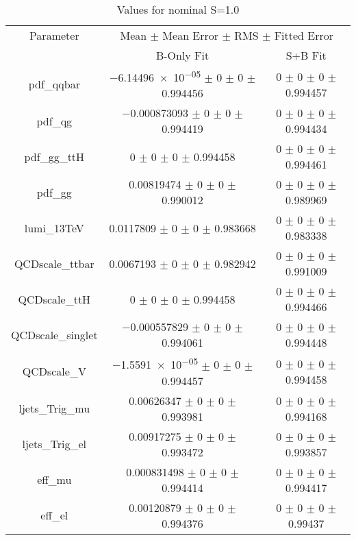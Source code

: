\begin{table}
\centering
\caption{Values for nominal S=1.0}
\begin{tabular}{ccc}
\toprule
Parameter & \multicolumn{2}{c}{Mean $\pm$ Mean Error $\pm$ RMS $\pm$ Fitted Error}\\
 & B-Only Fit & S+B Fit\\
\midrule
pdf\_qqbar & \num{-6.14496e-05} $\pm$ \num{0} $\pm$ \num{0} $\pm$ \num{0.994456} & \num{0} $\pm$ \num{0} $\pm$ \num{0} $\pm$ \num{0.994457}\\
pdf\_qg & \num{-0.000873093} $\pm$ \num{0} $\pm$ \num{0} $\pm$ \num{0.994419} & \num{0} $\pm$ \num{0} $\pm$ \num{0} $\pm$ \num{0.994434}\\
pdf\_gg\_ttH & \num{0} $\pm$ \num{0} $\pm$ \num{0} $\pm$ \num{0.994458} & \num{0} $\pm$ \num{0} $\pm$ \num{0} $\pm$ \num{0.994461}\\
pdf\_gg & \num{0.00819474} $\pm$ \num{0} $\pm$ \num{0} $\pm$ \num{0.990012} & \num{0} $\pm$ \num{0} $\pm$ \num{0} $\pm$ \num{0.989969}\\
lumi\_13TeV & \num{0.0117809} $\pm$ \num{0} $\pm$ \num{0} $\pm$ \num{0.983668} & \num{0} $\pm$ \num{0} $\pm$ \num{0} $\pm$ \num{0.983338}\\
QCDscale\_ttbar & \num{0.0067193} $\pm$ \num{0} $\pm$ \num{0} $\pm$ \num{0.982942} & \num{0} $\pm$ \num{0} $\pm$ \num{0} $\pm$ \num{0.991009}\\
QCDscale\_ttH & \num{0} $\pm$ \num{0} $\pm$ \num{0} $\pm$ \num{0.994458} & \num{0} $\pm$ \num{0} $\pm$ \num{0} $\pm$ \num{0.994466}\\
QCDscale\_singlet & \num{-0.000557829} $\pm$ \num{0} $\pm$ \num{0} $\pm$ \num{0.994061} & \num{0} $\pm$ \num{0} $\pm$ \num{0} $\pm$ \num{0.994448}\\
QCDscale\_V & \num{-1.5591e-05} $\pm$ \num{0} $\pm$ \num{0} $\pm$ \num{0.994457} & \num{0} $\pm$ \num{0} $\pm$ \num{0} $\pm$ \num{0.994458}\\
ljets\_Trig\_mu & \num{0.00626347} $\pm$ \num{0} $\pm$ \num{0} $\pm$ \num{0.993981} & \num{0} $\pm$ \num{0} $\pm$ \num{0} $\pm$ \num{0.994168}\\
ljets\_Trig\_el & \num{0.00917275} $\pm$ \num{0} $\pm$ \num{0} $\pm$ \num{0.993472} & \num{0} $\pm$ \num{0} $\pm$ \num{0} $\pm$ \num{0.993857}\\
eff\_mu & \num{0.000831498} $\pm$ \num{0} $\pm$ \num{0} $\pm$ \num{0.994414} & \num{0} $\pm$ \num{0} $\pm$ \num{0} $\pm$ \num{0.994417}\\
eff\_el & \num{0.00120879} $\pm$ \num{0} $\pm$ \num{0} $\pm$ \num{0.994376} & \num{0} $\pm$ \num{0} $\pm$ \num{0} $\pm$ \num{0.99437}\\

\end{tabular}
\end{table}
